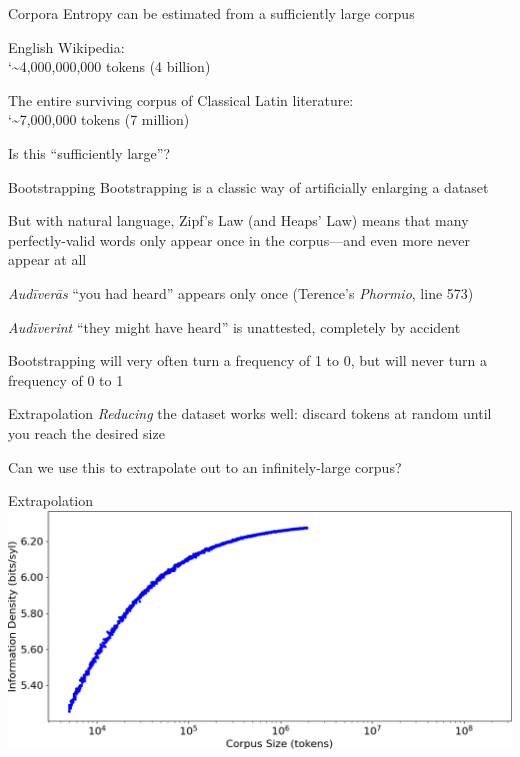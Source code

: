 \documentclass{beamer}
\newcommand{\realtilde}{\char`\~}
\begin{document}
\begin{frame}{Corpora}
Entropy can be estimated from a sufficiently large corpus

English Wikipedia:\\\quad\realtilde{}4,000,000,000 tokens (4 billion)

The entire surviving corpus of Classical Latin literature:\\\quad\realtilde{}7,000,000 tokens (7 million)

Is this ``sufficiently large''?
\end{frame}

\begin{frame}{Bootstrapping}
Bootstrapping is a classic way of artificially enlarging a dataset

But with natural language, Zipf's Law (and Heaps' Law) means that many perfectly-valid words only appear once in the corpus---and even more never appear at all

\emph{Audīverās} ``you had heard'' appears only once (Terence's \emph{Phormio}, line 573)

\emph{Audīverint} ``they might have heard'' is unattested, completely by accident

Bootstrapping will very often turn a frequency of 1 to 0, but will never turn a frequency of 0 to 1
\end{frame}

\begin{frame}{Extrapolation}
\emph{Reducing} the dataset works well: discard tokens at random until you reach the desired size

Can we use this to extrapolate out to an infinitely-large corpus?
\end{frame}

\begin{frame}{Extrapolation}
\includegraphics[width=\linewidth]{demo1}
\vspace{-2ex}
\[\quad\]
\end{frame}
\end{document}
